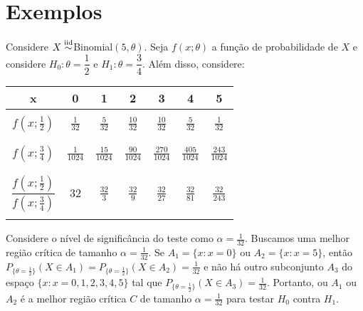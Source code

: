 \documentclass[12pt]{beamer}
\begin{document}
\section{Exemplos}
\begin{frame}{}
\begin{block}{}
\justifying
Considere $X\overset{\text{iid}}{\sim}$Binomial$(5,\theta).$ Seja $f(x;\theta)$ a função de probabilidade de $X$ e considere $H_{0}:\theta=\dfrac{1}{2}$ e $H_{1}:\theta=\dfrac{3}{4}.$ Além disso, considere:
\end{block}
\pause
\begin{block}{}
\justifying
\begin{table}[h]
    \centering
    \begin{tabular}{c|c|c|c|c|c|c}
         x& 0&1&2&3&4&5 \\
         \hline
                  & &&&&& \\
         $f(x;\frac{1}{2})$&$\frac{1}{32}$&$\frac{5}{32}$&$\frac{10}{32}$&$\frac{10}{32}$&$\frac{5}{32}$&$\frac{1}{32}$\\
                  & &&&&& \\
         \hline
         & &&&&& \\
         $f(x;\frac{3}{4})$&$\frac{1}{1024}$&$\frac{15}{1024}$&$\frac{90}{1024}$&$\frac{270}{1024}$&$\frac{405}{1024}$&$\frac{243}{1024}$\\
         & &&&&& \\
         \hline
         & &&&&& \\
         $\dfrac{f(x;\frac{1}{2})}{f(x;\frac{3}{4})}$&$32$&$\frac{32}{3}$&$\frac{32}{9}$&$\frac{32}{27}$&$\frac{32}{81}$&$\frac{32}{243}$\\
                 & &&&&& \\
         \hline
    \end{tabular}
\end{table}
\end{block}
\end{frame}

\begin{frame}{}
\begin{block}{}
\justifying
Considere o nível de significância do teste como \(\alpha = \frac{1}{32}\). Buscamos uma melhor região crítica de tamanho \(\alpha = \frac{1}{32}\). Se \(A_1 = \{x : x = 0\}\) ou \(A_2 = \{x : x = 5\}\), então \(P_{\{\theta=\frac{1}{2}\}}(X \in A_1) = P_{\{\theta=\frac{1}{2}\}}(X \in A_2) = \frac{1}{32}\) e não há outro subconjunto \(A_3\) do espaço \(\{x : x = 0, 1, 2, 3, 4, 5\}\) tal que \(P_{\{\theta=\frac{1}{2}\}}(X \in A_3) = \frac{1}{32}\). Portanto, ou \(A_1\) ou \(A_2\) é a melhor região crítica \(C\) de tamanho \(\alpha = \frac{1}{32}\) para testar \(H_0\) contra \(H_1\). 
\end{block}
\end{frame}
\end{document}
